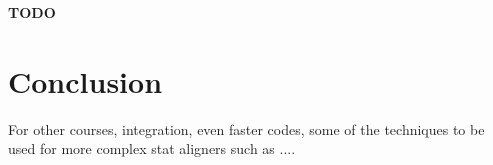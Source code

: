 \documentclass[runningheads,a4paper]{llncs}
\begin{document}
{\bf TODO} 

\section{Conclusion}
\label{conclusion}
For other courses, integration, even faster codes, some of the techniques to be used for more complex stat aligners such as ....







\end{document}
